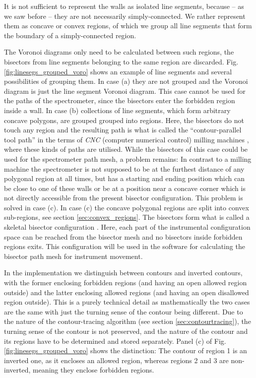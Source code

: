 It is not sufficient to represent the walls as isolated line segments, because -- 
as we saw before -- they are not necessarily simply-connected. 
We rather represent them as concave or convex regions, of which we group all 
line segments that form the boundary of a simply-connected region.

The Voronoi diagrams only need to be calculated between such regions, 
the bisectors from line segments belonging to the same region are discarded. 
Fig. \ref{fig:linesegs_grouped_voro} shows an example of line segments and several
possibilities of grouping them. 
In case (a) they are not grouped and the Voronoi diagram is just the line 
segment Voronoi diagram. This case cannot be used for the paths of the spectrometer,
since the bisectors enter the forbidden region inside a wall.
In case (b) collections of line segments, which form arbitrary concave polygons, 
are grouped grouped into regions. Here, the bisectors do not touch any region 
and the resulting path is what is called the ``contour-parallel tool path'' in 
the terms of \textit{CNC} (computer numerical control) milling machines \cite{Jeong1998, wiki_milling}, 
where these kinds of paths are utilised. While the bisectors of this case could 
be used for the spectrometer path mesh, a problem remains: In contrast to a milling
machine the spectrometer is not supposed to be at the furthest distance of any
polygonal region at all times, but has a starting and ending position which can 
be close to one of these walls or be at a position near a concave corner which
is not directly accessible from the present bisector configuration. This problem
is solved in case (c).
In case (c) the concave polygonal regions are split into convex sub-regions, see
section \ref{sec:convex_regions}.
The bisectors form what is called a skeletal bisector configuration \cite{Jeong1998, Couprie2007}.
Here, each part of the instrumental configuration space can be reached from the
bisector mesh and no bisectors inside forbidden regions exits. This configuration
will be used in the software for calculating the bisector path mesh for instrument
movement.

In the implementation we distinguish between contours and inverted contours, with 
the former enclosing forbidden regions (and having an open allowed region outside) 
and the latter enclosing allowed regions (and having an open disallowed region outside).
This is a purely technical detail as mathematically the two cases are the same
with just the turning sense of the contour being different. 
Due to the nature of the contour-tracing algorithm (see section \ref{sec:contourtracing}), 
the turning sense of the contour is not preserved, and the nature of the contour 
and its regions have to be determined and stored separately.
Panel (c) of Fig. \ref{fig:linesegs_grouped_voro} shows the distinction: 
The contour of region 1 is an inverted one, as it encloses an allowed region,
whereas regions 2 and 3 are non-inverted, meaning they enclose forbidden regions.

